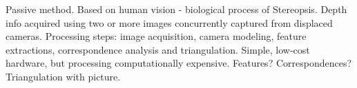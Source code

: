 Passive method. Based on human vision - biological process of Stereopsis. Depth info acquired using two or more images concurrently captured from displaced cameras. Processing steps: image acquisition, camera modeling, feature extractions, correspondence analysis and triangulation. Simple, low-cost hardware, but processing computationally expensive. Features? Correspondences? Triangulation with picture.


